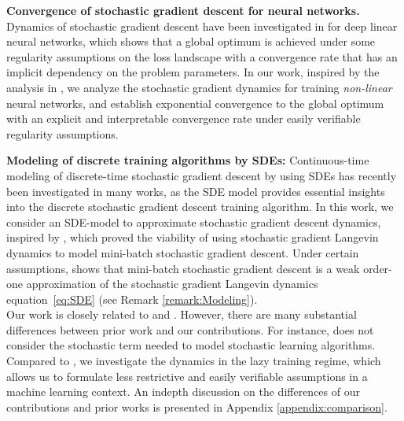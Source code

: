 \documentclass[10pt]{article} %
\def\eqref#1{equation~\ref{#1}}
\begin{document}
\textbf{Convergence of stochastic gradient descent for neural networks.} Dynamics of stochastic gradient descent have been investigated in \cite{lugosi2024convergencecontinuoustimestochasticgradient} for deep linear neural networks, which shows that a global optimum is achieved under some regularity assumptions on the loss landscape with a convergence rate that has an implicit dependency on the problem parameters. In our work, inspired by the analysis in \cite{lugosi2024convergencecontinuoustimestochasticgradient}, we analyze the stochastic gradient dynamics for training \emph{non-linear} neural networks, and establish exponential convergence to the global optimum with an explicit and interpretable convergence rate under easily verifiable regularity assumptions.



\textbf{Modeling of discrete training algorithms by SDEs:} Continuous-time modeling of discrete-time stochastic gradient descent by using SDEs has recently been investigated in many works, as the SDE model provides essential insights into the discrete stochastic gradient descent training algorithm. In this work, we consider an SDE-model to approximate stochastic gradient descent dynamics, inspired by \cite{EeSGDtoSDE}, which proved the viability of using stochastic gradient Langevin dynamics to model mini-batch stochastic gradient descent. Under certain assumptions, \cite{EeSGDtoSDE} shows that mini-batch stochastic gradient descent is a weak order-one approximation of the stochastic gradient Langevin dynamics \eqref{eq:SDE} (see Remark \ref{remark:Modeling}).\\
Our work is closely related to \cite{ChizatBachlazyTraining} and \cite{lugosi2024convergencecontinuoustimestochasticgradient}. However, there are many substantial differences between prior work and our contributions. For instance, \cite{ChizatBachlazyTraining} does not consider the stochastic term needed to model stochastic learning algorithms.
Compared to \cite{lugosi2024convergencecontinuoustimestochasticgradient}, we investigate the dynamics in the lazy training regime, which allows us to formulate less restrictive and easily verifiable assumptions in a machine learning context. An indepth discussion on the differences of our contributions and prior works is presented in Appendix \ref{appendix:comparison}.
\end{document}
